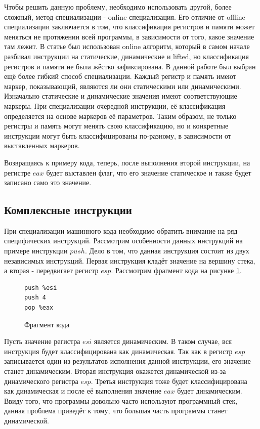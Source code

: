 Чтобы решить данную проблему, необходимо использовать другой, более сложный, метод специализации - online специализация. Его отличие от offline специализации заключается в том, что классификация регистров и памяти может меняться не протяжении всей программы, в зависимости от того, какое значение там лежит. В статье \cite{PEMC} был использован online алгоритм, который в самом начале разбивал инструкции на статические, динамические и lifted, но классификация регистров и памяти не была жёстко зафиксирована. В данной работе был выбран ещё более гибкий способ специализации. Каждый регистр и память имеют маркер, показывающий, являются ли они статическими или динамическими. Изначально статические и динамические значения имеют соответствующие маркеры. При специализации очередной инструкции, её классификация определяется на основе маркеров её параметров. Таким образом, не только регистры и память могут менять свою классификацию, но и конкретные инструкции могут быть классифицированы по-разному, в зависимости от выставленных маркеров.

Возвращаясь к примеру кода, теперь, после выполнения второй инструкции, на регистре $eax$ будет выставлен флаг, что его значение статическое и также будет записано само это значение.

\subsection{ Комплексные инструкции}
\label{part:4.2}
При специализации машинного кода необходимо обратить внимание на ряд специфических инструкций. Рассмотрим особенности данных инструкций на примере инструкции $push$. Дело в том, что данная инструкция состоит из двух независимых инструкций. Первая инструкция кладёт значение на вершину стека, а вторая - передвигает регистр $esp$. Рассмотрим фрагмент кода на рисунке \ref{fig:comp}.
\begin{figure}
\begin{lstlisting}[xleftmargin = 20pt]
push %esi
push 4
pop %eax
\end{lstlisting}
\caption{Фрагмент кода}
\label{fig:comp}
\end{figure}
Пусть значение регистра $esi$ является динамическим. В таком случае, вся инструкция будет классифицирована как динамическая. Так как в регистр $esp$ записывается один из результатов исполнения данной инструкции, его значение станет динамическим. Вторая инструкция окажется динамической из-за динамического регистра $esp$. Третья инструкция тоже будет классифицирована как  динамическая и после её выполнения значение $eax$ будет динамическим. Ввиду того, что программы довольно часто используют программный стек, данная проблема приведёт к тому, что большая часть программы станет динамической.

